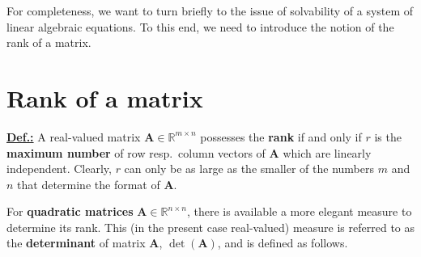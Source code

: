 \medskip
\noindent
For completeness, we want to turn briefly to the issue of 
solvability of a system of linear algebraic equations. To this 
end, we need to introduce the notion of the rank of a matrix.

\section[Rank of a matrix]%
{Rank of a matrix}

\noindent
\underline{\bf Def.:}
A real-valued matrix $\mathbf{A} \in \mathbb{R}^{m \times n}$ 
possesses the {\bf rank}
%
\be
{}
\ee
%
if and only if $r$ is the {\bf maximum number} of row resp.~column 
vectors of $\mathbf{A}$ which are linearly independent. Clearly, 
$r$ can only be as large as the smaller of the numbers $m$ and $n$ 
that determine the format of $\mathbf{A}$.

\medskip
\noindent
For {\bf quadratic matrices} $\mathbf{A} \in
\mathbb{R}^{n \times n}$, there is available a more elegant 
measure to determine its rank. This (in the present case 
real-valued) measure is referred to as the {\bf determinant} of 
matrix $\mathbf{A}$, $\det(\mathbf{A})$, and is defined as follows.

